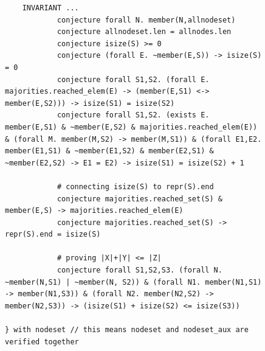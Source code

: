 {\begin{figure}
\begin{scriptsize}
\begin{verbatim}
    INVARIANT ...
            conjecture forall N. member(N,allnodeset)
            conjecture allnodeset.len = allnodes.len
            conjecture isize(S) >= 0
            conjecture (forall E. ~member(E,S)) -> isize(S) = 0
            conjecture forall S1,S2. (forall E. majorities.reached_elem(E) -> (member(E,S1) <-> member(E,S2))) -> isize(S1) = isize(S2)
            conjecture forall S1,S2. (exists E. member(E,S1) & ~member(E,S2) & majorities.reached_elem(E)) & (forall M. member(M,S2) -> member(M,S1)) & (forall E1,E2. member(E1,S1) & ~member(E1,S2) & member(E2,S1) & ~member(E2,S2) -> E1 = E2) -> isize(S1) = isize(S2) + 1

            # connecting isize(S) to repr(S).end
            conjecture majorities.reached_set(S) & member(E,S) -> majorities.reached_elem(E)
            conjecture majorities.reached_set(S) -> repr(S).end = isize(S)

            # proving |X|+|Y| <= |Z|
            conjecture forall S1,S2,S3. (forall N. ~member(N,S1) | ~member(N, S2)) & (forall N1. member(N1,S1) -> member(N1,S3)) & (forall N2. member(N2,S2) -> member(N2,S3)) -> (isize(S1) + isize(S2) <= isize(S3))

} with nodeset // this means nodeset and nodeset_aux are verified together
\end{verbatim}
\end{scriptsize}
\end{figure}
}



